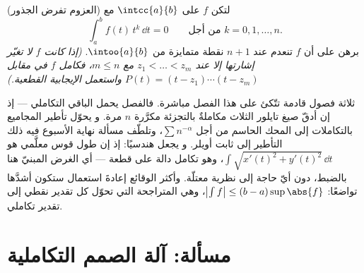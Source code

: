 \begin{exercise}[$\star\star\star$]\label{exo:b1:integration:12}
(العزوم تفرض الجذور) لتكن $f$  على $\intcc{a}{b}$
مع
\[
\int_a^b f(t)\,t^k\,\dd t = 0 \qquad \text{من أجل } k = 0, 1,
\dots, n .
\]
برهن على أن $f$ تنعدم عند $n + 1$ نقطة متمايزة من
$\intoo{a}{b}$. \emph{(إذا كانت $f$ لا تغيّر إشارتها إلا عند $z_1 < \dots
< z_m$ مع $m \leq n$، فكامل $f$ في مقابل $P(t) = (t - z_1)
\cdots (t - z_m)$ واستعمل الإيجابية القطعية.)}
\end{exercise}

\begin{remark}
ثلاثة فصول قادمة تتّكئ على هذا الفصل مباشرة.
فالفصل  يحمل الباقي التكاملي --- إذ إن أدقّ
صيغ تايلور الثلاث مكاملةٌ بالتجزئة
مكرَّرة $n$ مرة. و  يحوّل تأطير
المجاميع بالتكاملات إلى المحك الحاسم من أجل $\sum n^{-\alpha}$،
وتلطّف مسألة نهاية الأسبوع فيه ذلك التأطير إلى ثابت أويلر.
و  يجعل  هندسيًا: إذ إن
طول قوس معلَّمي هو $\int \sqrt{x'(t)^2 +
y'(t)^2}\,\dd t$، وهو تكامل دالة  على
قطعة --- أي الغرض المبنيّ هنا بالضبط، دون أيّ حاجة إلى
نظرية معتلّة. وأكثر الوقائع إعادةَ استعمال ستكون أشدَّها تواضعًا:
$\bigl|\int f\bigr| \leq (b - a)\sup\abs{f}$، وهي المتراجحة
التي تحوّل كل تقدير نقطي إلى تقدير تكاملي.
\end{remark}

\section{مسألة: آلة الصمم التكاملية}

